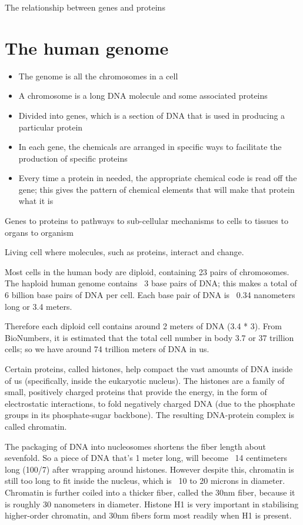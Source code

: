 The relationship between genes and proteins


\section{The human genome}

\begin{itemize}

   \item The genome is all the chromosomes in a cell
   \item A chromosome is a long DNA molecule and some associated proteins
   \item Divided into genes, which is a section of DNA that is used in producing a particular protein
   \item In each gene, the chemicals are arranged in specific ways to facilitate the production of specific proteins
   \item Every time a protein in needed, the appropriate chemical code is read off the gene; this gives the pattern of chemical elements that will make that protein what it is
   
\end{itemize}

Genes to proteins to pathways to sub-cellular mechanisms to cells to tissues to organs to organism

Living cell where molecules, such as proteins, interact and change.

Most cells in the human body are diploid, containing 23 pairs of chromosomes. The haploid human genome contains ~3 base pairs of DNA; this makes a total of 6 billion base pairs of DNA per cell. Each base pair of DNA is ~0.34 nanometers long or 3.4 meters\cite{pmid7354864}.

Therefore each diploid cell contains around 2 meters of DNA (3.4 * 3). From BioNumbers\cite{pmid23829164}, it is estimated that the total cell number in body 3.7 or 37 trillion cells; so we have around 74 trillion meters of DNA in us.

Certain proteins, called histones, help compact the vast amounts of DNA inside of us (specifically, inside the eukaryotic nucleus). The histones are a family of small, positively charged proteins that provide the energy, in the form of electrostatic interactions, to fold negatively charged DNA (due to the phosphate groups in its phosphate-sugar backbone). The resulting DNA-protein complex is called chromatin.

The packaging of DNA into nucleosomes shortens the fiber length about sevenfold. So a piece of DNA that's 1 meter long, will become ~14 centimeters long (100/7) after wrapping around histones. However despite this, chromatin is still too long to fit inside the nucleus, which is ~10 to 20 microns in diameter. Chromatin is further coiled into a thicker fiber, called the 30nm fiber, because it is roughly 30 nanometers in diameter. Histone H1 is very important in stabilising higher-order chromatin, and 30nm fibers form most readily when H1 is present.

